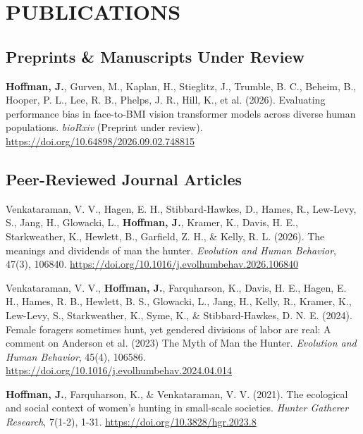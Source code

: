 \documentclass[a4paper,9pt]{extarticle}
\begin{document}
\section*{PUBLICATIONS}

\subsection*{Preprints \& Manuscripts Under Review}
\noindent \textbf{Hoffman, J.}, Gurven, M., Kaplan, H., Stieglitz, J., Trumble, B. C., Beheim, B., Hooper, P. L., Lee, R. B., Phelps, J. R., Hill, K., et al. (2026). Evaluating performance bias in face-to-BMI vision transformer models across diverse human populations. \textit{bioRxiv} (Preprint under review). \url{https://doi.org/10.64898/2026.09.02.748815}

\vspace{-0.2em}

\subsection*{Peer-Reviewed Journal Articles}
\noindent Venkataraman, V. V., Hagen, E. H., Stibbard-Hawkes, D., Hames, R., Lew-Levy, S., Jang, H., Glowacki, L., \textbf{Hoffman, J.}, Kramer, K., Davis, H. E., Starkweather, K., Hewlett, B., Garfield, Z. H., \& Kelly, R. L. (2026). The meanings and dividends of man the hunter. \textit{Evolution and Human Behavior}, 47(3), 106840. \url{https://doi.org/10.1016/j.evolhumbehav.2026.106840}

\vspace{5pt}
\noindent Venkataraman, V. V., \textbf{Hoffman, J.}, Farquharson, K., Davis, H. E., Hagen, E. H., Hames, R. B., Hewlett, B. S., Glowacki, L., Jang, H., Kelly, R., Kramer, K., Lew-Levy, S., Starkweather, K., Syme, K., \& Stibbard-Hawkes, D. N. E. (2024). Female foragers sometimes hunt, yet gendered divisions of labor are real: A comment on Anderson et al. (2023) The Myth of Man the Hunter. \textit{Evolution and Human Behavior}, 45(4), 106586. \url{https://doi.org/10.1016/j.evolhumbehav.2024.04.014}

\vspace{5pt}
\noindent \textbf{Hoffman, J.}, Farquharson, K., \& Venkataraman, V. V. (2021). The ecological and social context of women's hunting in small-scale societies. \textit{Hunter Gatherer Research}, 7(1-2), 1-31. \url{https://doi.org/10.3828/hgr.2023.8}

\end{document}
